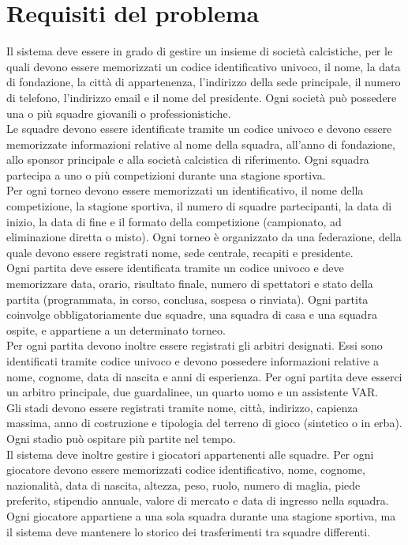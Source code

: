 \documentclass[12pt,a4paper]{report}
\begin{document}
\section{Requisiti del problema}

Il sistema deve essere in grado di gestire un insieme di società calcistiche, per le quali devono essere memorizzati un codice identificativo univoco, il nome, la data di fondazione, la città di appartenenza, l’indirizzo della sede principale, il numero di telefono, l’indirizzo email e il nome del presidente. Ogni società può possedere una o più squadre giovanili o professionistiche.\\
Le squadre devono essere identificate tramite un codice univoco e devono essere memorizzate informazioni relative al nome della squadra, all’anno di fondazione, allo sponsor principale e alla società calcistica di riferimento. Ogni squadra partecipa a uno o più competizioni durante una stagione sportiva.\\
Per ogni torneo devono essere memorizzati un identificativo, il nome della competizione, la stagione sportiva, il numero di squadre partecipanti, la data di inizio, la data di fine e il formato della competizione (campionato, ad eliminazione diretta o misto). Ogni torneo è organizzato da una federazione, della quale devono essere registrati nome, sede centrale, recapiti e presidente.\\
Ogni partita deve essere identificata tramite un codice univoco e deve memorizzare data, orario, risultato finale, numero di spettatori e stato della partita (programmata, in corso, conclusa, sospesa o rinviata). Ogni partita coinvolge obbligatoriamente due squadre, una squadra di casa e una squadra ospite, e appartiene a un determinato torneo.\\
Per ogni partita devono inoltre essere registrati gli arbitri designati. Essi sono identificati tramite codice univoco e devono possedere informazioni relative a nome, cognome, data di nascita e anni di esperienza. Per ogni partita deve esserci un arbitro principale, due guardalinee, un quarto uomo e un assistente VAR.\\
Gli stadi devono essere registrati tramite nome, città, indirizzo, capienza massima, anno di costruzione e tipologia del terreno di gioco (sintetico o in erba). Ogni stadio può ospitare più partite nel tempo.\\
Il sistema deve inoltre gestire i giocatori appartenenti alle squadre. Per ogni giocatore devono essere memorizzati codice identificativo, nome, cognome, nazionalità, data di nascita, altezza, peso, ruolo, numero di maglia, piede preferito, stipendio annuale, valore di mercato e data di ingresso nella squadra. Ogni giocatore appartiene a una sola squadra durante una stagione sportiva, ma il sistema deve mantenere lo storico dei trasferimenti tra squadre differenti.\\
\end{document}
